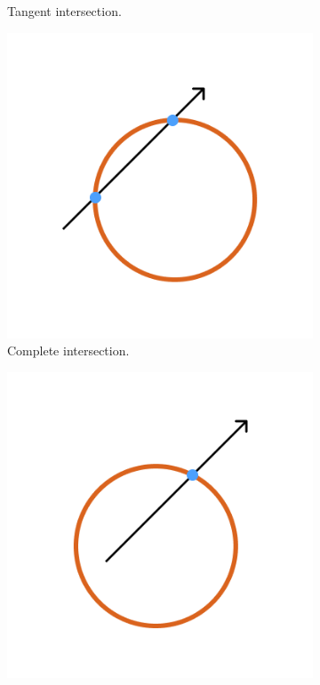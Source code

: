 \documentclass[a4paper,11pt,oneside]{article}
\begin{document}
\begin{figure}[ht]
\begin{subfigure}[b]{0.3\textwidth}
         \caption{Tangent intersection.}
          \label{sec3.1:tangent-intersection}
     \end{subfigure}
     \hfill
     \begin{subfigure}[b]{0.3\textwidth}
         \centering
         \includegraphics[width=\textwidth]{section3/3.1/intersection-in-out.png}
         \caption{Complete intersection.}
         \label{sec3.1:complete-intersection}
     \end{subfigure}
     \hfill
     \begin{subfigure}[b]{0.3\textwidth}
         \centering
         \includegraphics[width=\textwidth]{section3/3.1/intersection-out.png}

\end{subfigure}
\end{figure}
\end{document}
